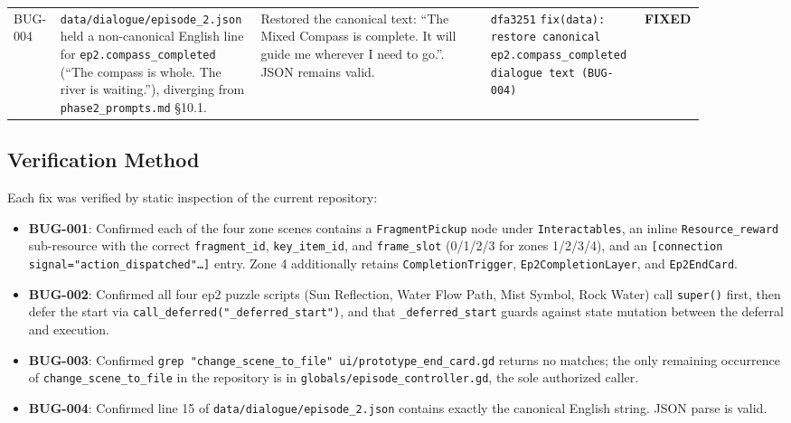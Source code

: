 \documentclass[12pt, a4paper]{article}
\newcommand{\sevFixed}{\textcolor{passgre}{\textbf{FIXED}}}
\begin{document}
\begin{center}
\begin{longtable}{p{0.06\linewidth} p{0.24\linewidth} p{0.32\linewidth} p{0.20\linewidth} p{0.07\linewidth}}
BUG-004 &
\texttt{data/dialogue/episode\_2.json} held a non-canonical English line for \texttt{ep2.compass\_completed} (``The compass is whole. The river is waiting.''), diverging from \texttt{phase2\_prompts.md} \S10.1. &
Restored the canonical text: ``The Mixed Compass is complete. It will guide me wherever I need to go.''. JSON remains valid. &
\texttt{dfa3251} \newline \texttt{fix(data): restore canonical ep2.compass\_completed dialogue text (BUG-004)} &
\sevFixed \\

\end{longtable}
\end{center}

\subsection{Verification Method}

Each fix was verified by static inspection of the current repository:

\begin{itemize}[nosep]
  \item \textbf{BUG-001}: Confirmed each of the four zone scenes contains a
        \texttt{FragmentPickup} node under \texttt{Interactables}, an inline
        \texttt{Resource\_reward} sub-resource with the correct
        \texttt{fragment\_id}, \texttt{key\_item\_id}, and \texttt{frame\_slot}
        (0/1/2/3 for zones 1/2/3/4), and an
        \texttt{[connection signal="action\_dispatched"\dots]} entry. Zone 4
        additionally retains \texttt{CompletionTrigger},
        \texttt{Ep2CompletionLayer}, and \texttt{Ep2EndCard}.
  \item \textbf{BUG-002}: Confirmed all four ep2 puzzle scripts (Sun
        Reflection, Water Flow Path, Mist Symbol, Rock Water) call
        \texttt{super()} first, then defer the start via
        \texttt{call\_deferred("\_deferred\_start")}, and that
        \texttt{\_deferred\_start} guards against state mutation between the
        deferral and execution.
  \item \textbf{BUG-003}: Confirmed \texttt{grep "change\_scene\_to\_file"
        ui/prototype\_end\_card.gd} returns no matches; the only remaining
        occurrence of \texttt{change\_scene\_to\_file} in the repository is in
        \texttt{globals/episode\_controller.gd}, the sole authorized caller.
  \item \textbf{BUG-004}: Confirmed line 15 of
        \texttt{data/dialogue/episode\_2.json} contains exactly the canonical
        English string. JSON parse is valid.
\end{itemize}
\end{document}
